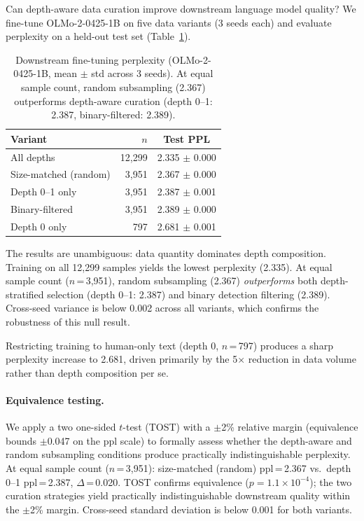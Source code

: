 Can depth-aware data curation improve downstream language model quality?
We fine-tune OLMo-2-0425-1B on five data variants (3 seeds each) and evaluate perplexity on a held-out test set (Table~\ref{tab:downstream}).

\begin{table}[ht]
\centering
\small
\caption{Downstream fine-tuning perplexity (OLMo-2-0425-1B, mean $\pm$ std across 3 seeds). At equal sample count, random subsampling (2.367) outperforms depth-aware curation (depth 0--1: 2.387, binary-filtered: 2.389).}
\label{tab:downstream}
\begin{tabular}{lrc}
\toprule
\textbf{Variant} & \textbf{$n$} & \textbf{Test PPL} \\
\midrule
All depths            & 12{,}299 & 2.335 $\pm$ 0.000 \\
Size-matched (random) & 3{,}951  & 2.367 $\pm$ 0.000 \\
Depth 0--1 only       & 3{,}951  & 2.387 $\pm$ 0.001 \\
Binary-filtered       & 3{,}951  & 2.389 $\pm$ 0.000 \\
Depth 0 only          & 797      & 2.681 $\pm$ 0.001 \\
\bottomrule
\end{tabular}
\end{table}

The results are unambiguous: data quantity dominates depth composition.
Training on all 12{,}299 samples yields the lowest perplexity (2.335).
At equal sample count ($n$\,=\,3{,}951), random subsampling (2.367) \emph{outperforms} both depth-stratified selection (depth 0--1: 2.387) and binary detection filtering (2.389).
Cross-seed variance is below 0.002 across all variants, which confirms the robustness of this null result.

Restricting training to human-only text (depth 0, $n$\,=\,797) produces a sharp perplexity increase to 2.681, driven primarily by the 5$\times$ reduction in data volume rather than depth composition per se.

\paragraph{Equivalence testing.}
We apply a two one-sided $t$-test (TOST) with a $\pm$2\% relative margin (equivalence bounds $\pm$0.047 on the ppl scale) to formally assess whether the depth-aware and random subsampling conditions produce practically indistinguishable perplexity.
At equal sample count ($n$\,=\,3{,}951): size-matched (random) ppl\,=\,2.367 vs.\ depth 0--1 ppl\,=\,2.387, $\Delta$\,=\,0.020.
TOST confirms equivalence ($p = 1.1 \times 10^{-4}$); the two curation strategies yield practically indistinguishable downstream quality within the $\pm$2\% margin.
Cross-seed standard deviation is below 0.001 for both variants.

